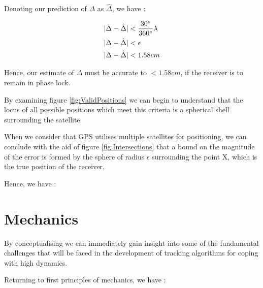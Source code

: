 Denoting our prediction of $\Delta$ as $\hat{\Delta}$, we have :

\begin{align}
|\Delta-\hat{\Delta}|& < \frac{30\degree}{360\degree} \lambda\\
|\Delta-\hat{\Delta}|&<\epsilon\\
|\Delta-\hat{\Delta}|&<1.58cm\\
\label{eq:RangeErrorBound}
\end{align}

Hence, our estimate of $\Delta$ must be accurate to $< 1.58cm$, if the receiver is to remain in phase lock.

By examining figure \ref{fig:ValidPositions} we can begin to understand that the locus of all possible positions which meet this criteria is a spherical shell surrounding the satellite. 

When we consider that GPS utilises multiple satellites for positioning, we can conclude with the aid of figure \ref{fig:Intersections} that a bound on the magnitude of the error is formed by the sphere of radius $\epsilon$ surrounding the point X, which is the true position of the receiver. 

Hence, we have :

\begin{comment}
\begin{align}
| X(t)-\hat{X}(t) | & < \frac{30\degree}{360\degree} \lambda \\
| X(t)-\hat{X}(t) | &<\Delta\\
| X(t)-\hat{X}(t) | & < 1.58cm
\label{eq:PositionErrorBound}
\end{align}
\end{comment}

\section{Mechanics}

By conceptualising we can immediately gain insight into some of the fundamental challenges that will be faced in the development of tracking algorithms for coping with high dynamics.








Returning to first principles of mechanics, we have \cite{salas1999etgen} : 

